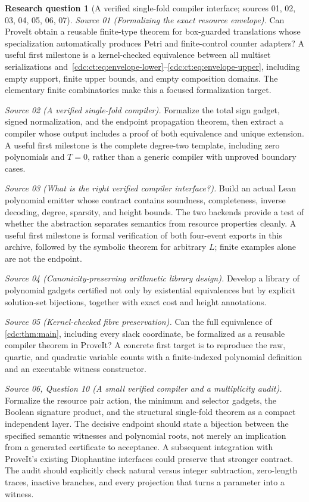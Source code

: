 \documentclass[11pt,a4paper]{article}
\theoremstyle{definition}
\newtheorem{question}[question]{Research question}
\theoremstyle{remark}
\begin{document}
\begin{question}[A verified single-fold compiler interface; sources 01, 02, 03, 04, 05, 06, 07]\label{cdc:q:verified}
\emph{Source 01 (Formalizing the exact resource envelope).}
Can ProveIt obtain a reusable finite-type theorem for box-guarded translations whose specialization automatically produces Petri and finite-control counter adapters? A useful first milestone is a kernel-checked equivalence between all multiset serializations and~\eqref{cdc:ct:eq:envelope-lower}--\eqref{cdc:ct:eq:envelope-upper}, including empty support, finite upper bounds, and empty composition domains. The elementary finite combinatorics make this a focused formalization target.

\emph{Source 02 (A verified single-fold compiler).}
Formalize the total sign gadget, signed normalization, and the endpoint
propagation theorem, then extract a compiler whose output includes a
proof of both equivalence and unique extension. A useful first milestone
is the complete degree-two template, including zero polynomials and
$T=0$, rather than a generic compiler with unproved boundary cases.

\emph{Source 03 (What is the right verified compiler interface?).}
Build an actual Lean polynomial emitter whose contract contains soundness,
completeness, inverse decoding, degree, sparsity, and height bounds. The two
backends provide a test of whether the abstraction separates semantics from
resource properties cleanly. A useful first milestone is formal verification
of both four-event exports in this archive, followed by the symbolic theorem
for arbitrary $L$; finite examples alone are not the endpoint.

\emph{Source 04 (Canonicity-preserving arithmetic library design).}
Develop a library of polynomial gadgets certified not only by existential equivalences but by explicit solution-set bijections, together with exact cost and height annotations.

\emph{Source 05 (Kernel-checked fibre preservation).}
Can the full equivalence of \cref{cdc:thm:main}, including every slack coordinate, be formalized as a reusable compiler theorem in ProveIt? A concrete first target is to reproduce the raw, quartic, and quadratic variable counts with a finite-indexed polynomial definition and an executable witness constructor.

\emph{Source 06, Question 10 (A small verified compiler and a multiplicity audit).}
Formalize the resource pair action, the minimum and
selector gadgets, the Boolean signature product, and the structural
single-fold theorem as a compact independent layer. The decisive endpoint
should state a bijection between the specified semantic witnesses and
polynomial roots, not merely an implication from a generated certificate to
acceptance. A subsequent integration with ProveIt's existing Diophantine
interfaces could preserve that stronger contract. The audit should explicitly
check natural versus integer subtraction, zero-length traces, inactive
branches, and every projection that turns a parameter into a witness.


\end{question}
\end{document}
